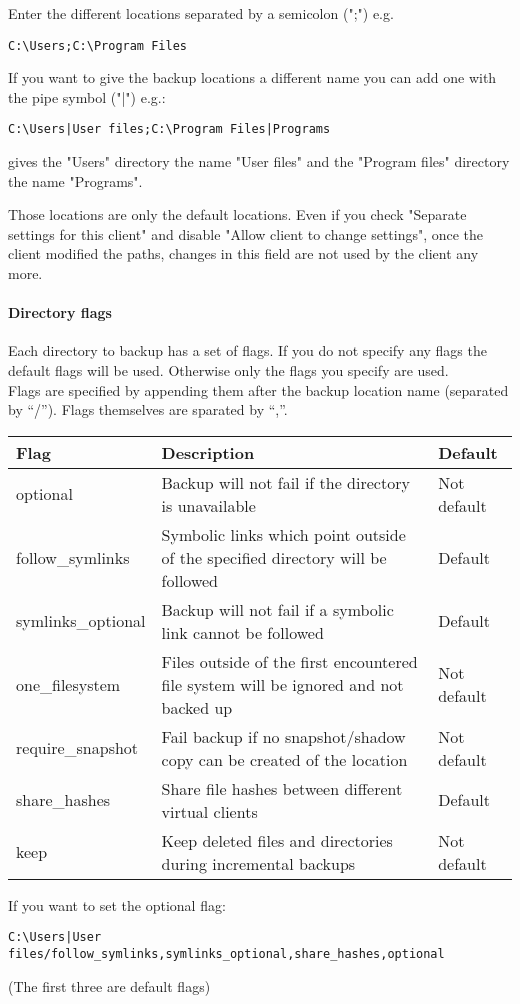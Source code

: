 \documentclass[a4paper,10pt]{article}
\begin{document}
Enter the different locations separated by a semicolon (";") e.g.
\begin{verbatim}
C:\Users;C:\Program Files
\end{verbatim}
If you want to give the backup locations a different name you can add one with the pipe symbol ("|") e.g.:
\begin{verbatim}
C:\Users|User files;C:\Program Files|Programs
\end{verbatim}
gives the "Users" directory the name "User files" and the "Program files" directory the name "Programs".

Those locations are only the default locations. Even if you check "Separate settings for this client" and disable "Allow client to change settings", once the client modified the paths, changes in this field are not used by the client any more.

\paragraph{Directory flags}
Each directory to backup has a set of flags. If you do not specify any flags the default flags will be used. Otherwise only the flags you specify are used.\\
Flags are specified by appending them after the backup location name (separated by ``/''). Flags themselves are sparated by ``,''.

\begin{tabular}{|p{}|p{}|p{}|}
\hline
Flag & Description & Default\\
\hline\hline
optional & Backup will not fail if the directory is unavailable & Not default\\
\hline
follow\_symlinks & Symbolic links which point outside of the specified directory will be followed & Default\\
\hline
symlinks\_optional & Backup will not fail if a symbolic link cannot be followed & Default\\
\hline
one\_filesystem & Files outside of the first encountered file system will be ignored and not backed up & Not default \\
\hline
require\_snapshot & Fail backup if no snapshot/shadow copy can be created of the location & Not default\\
\hline
share\_hashes & Share file hashes between different virtual clients & Default\\
\hline
keep & Keep deleted files and directories during incremental backups & Not default\\
\hline
\end{tabular}
\par\null\par
\noindent If you want to set the optional flag:
\begin{verbatim}
C:\Users|User files/follow_symlinks,symlinks_optional,share_hashes,optional
\end{verbatim}
(The first three are default flags)
\end{document}
